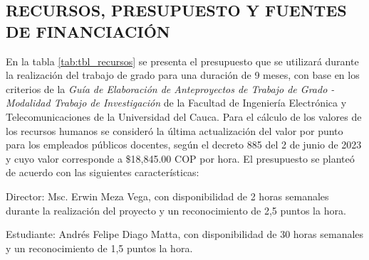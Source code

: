 \begin{center}
    \item \section{RECURSOS, PRESUPUESTO Y FUENTES DE FINANCIACIÓN}
\end{center}

En la tabla \ref{tab:tbl_recursos} se presenta el presupuesto que se utilizará durante la realización del trabajo de grado para una duración de 9 meses, con base en los criterios de la \textit{Guía de Elaboración de Anteproyectos de Trabajo de Grado - Modalidad Trabajo de Investigación} de la Facultad de Ingeniería Electrónica y Telecomunicaciones de la Universidad del Cauca. Para el cálculo de los valores de los recursos humanos se consideró la última actualización del valor por punto para los empleados públicos docentes, según el decreto 885 del 2 de junio de 2023 y cuyo valor corresponde a \$18,845.00  COP por hora. El presupuesto se planteó de acuerdo con las siguientes características: \par

Director: Msc. Erwin Meza Vega, con disponibilidad de 2 horas semanales durante la realización del proyecto y un reconocimiento de 2,5 puntos la hora. \par

Estudiante: Andrés Felipe Diago Matta, con disponibilidad de 30 horas semanales y un reconocimiento de 1,5 puntos la hora. \ \par



